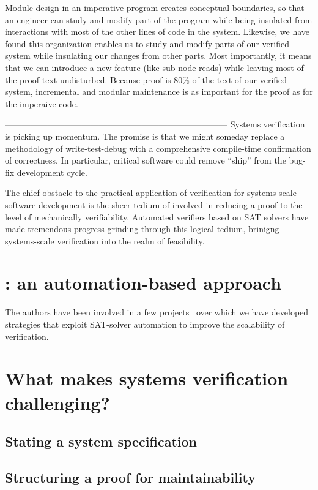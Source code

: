 Module design in an imperative program creates conceptual boundaries,
so that an engineer can study and modify part of the program while being
insulated from interactions with most of the other lines of code in the
system.
Likewise, we have found this organization enables us to study and modify
parts of our verified system while insulating our changes from other
parts. Most importantly, it means that we can introduce a new feature
(like sub-node reads) while leaving most of the proof text undisturbed.
Because proof is 80\% of the text of our verified system,
incremental and modular maintenance is as important for the proof as
for the imperaive code.


------------------------------------------------------------------------------
Systems verification is picking up momentum.
The promise is that we might someday replace a methodology of
write-test-debug with a comprehensive compile-time confirmation
of correctness. In particular, critical software could remove
``ship'' from the bug-fix development cycle.

The chief obstacle to the practical application of verification for
systems-scale software development is the sheer tedium of involved
in reducing a proof to the level of mechanically verifiability.
Automated verifiers based on SAT solvers have made tremendous progress
grinding through this logical tedium, brinigng systems-scale
verification into the realm of feasibility.


\section{{\ironstar}: an automation-based approach}

The authors have been involved in a few projects~\cite{}
over which we have developed strategies that exploit
SAT-solver automation to improve the scalability of verification.

\section{What makes systems verification challenging?}

\subsection{Stating a system specification}

\subsection{Structuring a proof for maintainability}


